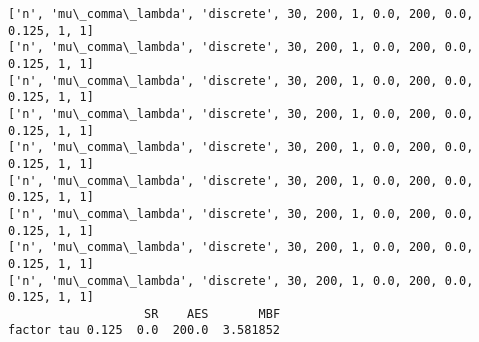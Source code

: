 \documentclass[11pt]{article}
\begin{document}
\begin{Verbatim}[commandchars=\\\{\}]
['n', 'mu\_comma\_lambda', 'discrete', 30, 200, 1, 0.0, 200, 0.0, 0.125, 1, 1]
['n', 'mu\_comma\_lambda', 'discrete', 30, 200, 1, 0.0, 200, 0.0, 0.125, 1, 1]
['n', 'mu\_comma\_lambda', 'discrete', 30, 200, 1, 0.0, 200, 0.0, 0.125, 1, 1]
['n', 'mu\_comma\_lambda', 'discrete', 30, 200, 1, 0.0, 200, 0.0, 0.125, 1, 1]
['n', 'mu\_comma\_lambda', 'discrete', 30, 200, 1, 0.0, 200, 0.0, 0.125, 1, 1]
['n', 'mu\_comma\_lambda', 'discrete', 30, 200, 1, 0.0, 200, 0.0, 0.125, 1, 1]
['n', 'mu\_comma\_lambda', 'discrete', 30, 200, 1, 0.0, 200, 0.0, 0.125, 1, 1]
['n', 'mu\_comma\_lambda', 'discrete', 30, 200, 1, 0.0, 200, 0.0, 0.125, 1, 1]
['n', 'mu\_comma\_lambda', 'discrete', 30, 200, 1, 0.0, 200, 0.0, 0.125, 1, 1]
                   SR    AES       MBF
factor tau 0.125  0.0  200.0  3.581852

    \end{Verbatim}
\end{document}
